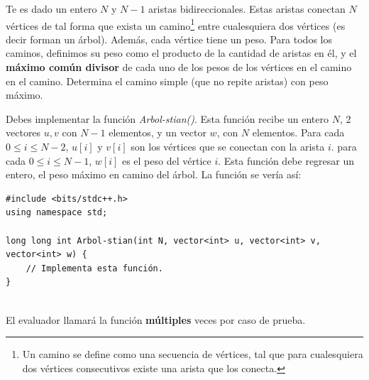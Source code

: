 \documentclass[12pt]{scrartcl}
\begin{document}
    
    
    \vspace{10pt}

    
    
        Te es dado un entero $N$ y $N - 1$ aristas bidireccionales. Estas aristas conectan $N$ vértices de tal forma que exista un camino\footnote{Un camino se define como una secuencia de vértices, tal que para cualesquiera dos vértices consecutivos existe una arista que los conecta.} entre cualesquiera dos vértices (es decir forman un árbol). Además, cada vértice tiene un peso. Para todos los caminos, definimos su peso como el producto de la cantidad de aristas en él, y el {\bfseries máximo común divisor} de cada uno de los pesos de los vértices en el camino en el camino. Determina el camino simple (que no repite aristas) con peso máximo.
    

        Debes implementar la función \textit{Arbol-stian()}. Esta función recibe un entero $N$, 2 vectores $u, v$ con $N - 1$ elementos, y un vector $w$, con $N$ elementos. Para cada $0 \le i \le N - 2$, $u[i]$ y $v[i]$ son los vértices que se conectan con la arista $i$. para cada $0 \le i \le N - 1$, $w[i]$ es el peso del vértice $i$. Esta función debe regresar un entero, el peso máximo en camino del árbol.
        La función se vería así:

\begin{verbatim}
#include <bits/stdc++.h>
using namespace std;

long long int Arbol-stian(int N, vector<int> u, vector<int> v, vector<int> w) {
    // Implementa esta función.
}
    
\end{verbatim}

    El evaluador llamará la función \textbf{múltiples} veces por caso de prueba.

    
\end{document}
